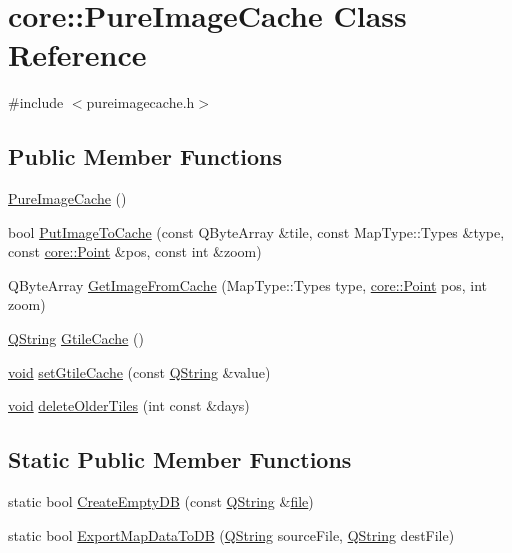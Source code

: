 \hypertarget{classcore_1_1_pure_image_cache}{\section{core\-:\-:\-Pure\-Image\-Cache \-Class \-Reference}
\label{classcore_1_1_pure_image_cache}
}


{\ttfamily \#include $<$pureimagecache.\-h$>$}

\subsection*{\-Public \-Member \-Functions}
\begin{DoxyCompactItemize}
\item 
\hyperlink{group___o_p_map_widget_ga28510761dcb972fdc54b26b91f199770}{\-Pure\-Image\-Cache} ()
\item 
bool \hyperlink{group___o_p_map_widget_gaabe1bf4c819005ff575270660c86503e}{\-Put\-Image\-To\-Cache} (const \-Q\-Byte\-Array \&tile, const \-Map\-Type\-::\-Types \&type, const \hyperlink{structcore_1_1_point}{core\-::\-Point} \&pos, const int \&zoom)
\item 
\-Q\-Byte\-Array \hyperlink{group___o_p_map_widget_gae7df6a861aa9bec0d6cb196ef1de84b1}{\-Get\-Image\-From\-Cache} (\-Map\-Type\-::\-Types type, \hyperlink{structcore_1_1_point}{core\-::\-Point} pos, int zoom)
\item 
\hyperlink{group___u_a_v_objects_plugin_gab9d252f49c333c94a72f97ce3105a32d}{\-Q\-String} \hyperlink{group___o_p_map_widget_ga30cc962d96388e3769ca3807c35d84ed}{\-Gtile\-Cache} ()
\item 
\hyperlink{group___u_a_v_objects_plugin_ga444cf2ff3f0ecbe028adce838d373f5c}{void} \hyperlink{group___o_p_map_widget_gaf4e3245a367b45b888ca368f03ae9300}{set\-Gtile\-Cache} (const \hyperlink{group___u_a_v_objects_plugin_gab9d252f49c333c94a72f97ce3105a32d}{\-Q\-String} \&value)
\item 
\hyperlink{group___u_a_v_objects_plugin_ga444cf2ff3f0ecbe028adce838d373f5c}{void} \hyperlink{group___o_p_map_widget_ga1ae13fc8322336ab8de6f1c6ad09793c}{delete\-Older\-Tiles} (int const \&days)
\end{DoxyCompactItemize}
\subsection*{\-Static \-Public \-Member \-Functions}
\begin{DoxyCompactItemize}
\item 
static bool \hyperlink{group___o_p_map_widget_gac23ecdf49009e55e9e7358c990f32bfa}{\-Create\-Empty\-D\-B} (const \hyperlink{group___u_a_v_objects_plugin_gab9d252f49c333c94a72f97ce3105a32d}{\-Q\-String} \&\hyperlink{uavobjecttemplate_8m_a97c04efa65bcf0928abf9260bc5cbf46}{file})
\item 
static bool \hyperlink{group___o_p_map_widget_ga4cd3a5c37b5805594bf922e266312836}{\-Export\-Map\-Data\-To\-D\-B} (\hyperlink{group___u_a_v_objects_plugin_gab9d252f49c333c94a72f97ce3105a32d}{\-Q\-String} source\-File, \hyperlink{group___u_a_v_objects_plugin_gab9d252f49c333c94a72f97ce3105a32d}{\-Q\-String} dest\-File)
\end{DoxyCompactItemize}



